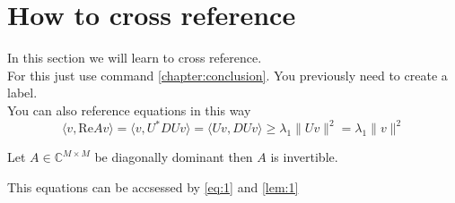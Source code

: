 \section{How to cross reference}
In this section we will learn to cross reference.\\
For this just use command \ref{chapter:conclusion}.  You previously need to create a label.\\
You can also reference equations in this way
\begin{equation}
\label{eq:1}
\langle v,\text{Re}A v\rangle =\langle v,U^*DUv\rangle=\langle Uv,DUv\rangle\geq \lambda_1\|Uv\|^2=\lambda_1\|v\|^2
\end{equation}

\begin{lem}
\label{lem:1}
Let $A\in \mathbb{C}^{M\times M}$ be diagonally dominant then $A$ is invertible.
\end{lem}

This equations can be accsessed by \ref{eq:1} and \ref{lem:1}